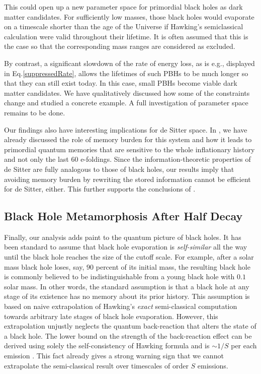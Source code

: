 \documentclass[aps,prd,reprint,superscriptaddress,nofootinbib]{revtex4-2}
\makeatletter
\newcommand*{\eg}{e.g., }
\newcommand*{\Eq}{Eq.\@\xspace}
\makeatother
\begin{document}
This could open up a new parameter space for primordial black holes as dark matter candidates. For sufficiently low masses, those black holes would evaporate on a timescale shorter than the age of the Universe if Hawking's semiclassical calculation were valid throughout their lifetime. It is 
often assumed that this is the case 
so that the corresponding mass ranges are considered as excluded.

By contrast, a significant slowdown of the rate of energy loss, as is \eg 
displayed in \Eq \eqref{suppressedRate}, allows the lifetimes of such PBHs to be much longer so that they can still exist today. In this case, small PBHs become viable dark matter candidates. We have qualitatively discussed how some of the constraints change and studied a concrete example. A 
full investigation of parameter space remains to be done. 


Our findings also have interesting implications for de Sitter space. In \cite{1812.08749}, we have already discussed the role of memory burden for 
this system and how it leads to primordial quantum memories that are sensitive to the whole inflationary history and not only the last $60$ e-foldings. Since the information-theoretic properties of de Sitter are fully analogous to those of black holes, our results imply that avoiding memory burden by rewriting the stored information cannot be efficient for de Sitter, either. This further supports the conclusions of \cite{1812.08749}.


\subsection{Black Hole Metamorphosis After Half Decay}
Finally, our analysis adds paint to the quantum picture of black holes. It has been standard to assume that black hole evaporation 
is {\it self-similar} all the way until the black hole reaches the size of the cutoff scale. 
For example, after a solar mass black hole loses, say, $90$ percent of its initial mass, the resulting black hole is commonly believed to be indistinguishable from a 
young black hole with $0.1$ solar mass. 
  In other words, the standard assumption is that a black hole at any stage of its existence has no memory about its prior 
history. This assumption is based on naive extrapolation of Hawking's 
{\it exact}  semi-classical computation towards arbitrary late stages  
of black hole evaporation.  However, 
this extrapolation unjustly neglects the quantum 
back-reaction that alters the state of a black hole. 
The lower bound on the strength of the back-reaction effect can be derived using solely the self-consistency of Hawking formula
and is $\sim 1/S$ per each emission \cite{1509.04645}. 
This fact already gives a strong warning sign that we cannot extrapolate the semi-classical result over timescales of order $S$ emissions.  
\end{document}

